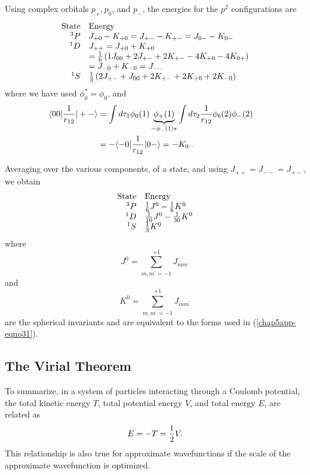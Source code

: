 Using complex orbitals $p_+ , p_0$, and $p_-$, the energies for the 
$p^2$ configurations are
\begin{equation}
\begin{array}{rl}
\mathrm{State} & \mathrm{Energy}\\
{^3P} & J_{+0} - K_{+0} = J_{+-} - K_{+-} = J_{0-} - K_{0-}\cr
{^1D} & J_{++} = J_{+0} + K_{+0}\cr
  &= {1 \over 6} \left( 1 J_{00} + 2J_{+-} + 2K_{+-} - 4K_{+0} - 
4K_{0+} \right)\cr
&= J_{-0} + K_{-0} = J_{--}\cr
{^1S} & {1 \over 3} \left( 2 J_{+-} + J_{00} + 2K_{+-} + 
2K_{+0} + 2K_{-0} \right)\cr
\end{array}
\end{equation}
where we have used $\phi^*_0 = \phi_0$, and
\begin{eqnarray}
\langle 0 0 | {1 \over r_{12}} | + - \rangle &= \int d 
\tau_1 \phi_0 (1) \underbrace{\phi_+(1)}_{-\phi_-(1)*} \int d \tau_2 
{1 \over r_{12}} \phi_b (2) \phi_- (2)\cr
&= - \langle - 0 | {1 \over r_{12}} | 0 - \rangle = - 
K_{0-}\cr
\end{eqnarray}

Averaging over the various components, of a state, and using $J_{++} = 
J_{--} = J_{+-}$, we obtain
\begin{equation}
\begin{array}{rl}
\mathrm{State} & \mathrm{Energy}\\
{^3P} & {1 \over 6} J^0 - {1 \over 6} K^0\cr
{^1D} & {1 \over 10} J^0 - {1 \over 30} K^0\cr
{^1S} & {1 \over 3} K^0 \\
\end{array}
\end{equation}
where
\begin{equation}
J^0 = \sum^{+1}_{m,m^{\prime}=-1} J_{mm^{\prime}}
\end{equation}
and
\begin{equation}
K^0 = \sum^{+1}_{m,m^{\prime}=-1} J_{mm^{\prime}}
\end{equation}
are the spherical invariants and are equivalent to the forms used in 
(\ref{chap5app-eqno31}).

\subsection{The Virial Theorem}

To summarize, in a system of particles interacting through a Coulomb 
potential, the total kinetic energy $T$, total potential energy $V$, 
and total energy $E$, are related as
\begin{equation}
E = - T = {1 \over 2} V.
\end{equation}
This relationship is also true for approximate wavefunctions if the 
scale of the approximate wavefunction is optimized.

